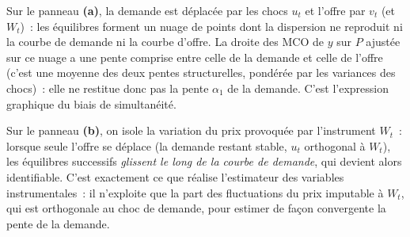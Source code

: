 \documentclass[12pt,a4paper,notitlepage]{article}
\begin{document}
Sur le panneau \textbf{(a)}, la demande est déplacée par les chocs
$u_t$ et l'offre par $v_t$ (et $W_t$)~: les équilibres forment un nuage
de points dont la dispersion ne reproduit ni la courbe de demande ni la
courbe d'offre. La droite des MCO de $y$ sur $P$ ajustée sur ce nuage a
une pente comprise entre celle de la demande et celle de l'offre (c'est
une moyenne des deux pentes structurelles, pondérée par les variances
des chocs)~: elle ne restitue donc pas la pente $\alpha_1$ de la
demande. C'est l'expression graphique du biais de simultanéité.

\medskip

Sur le panneau \textbf{(b)}, on isole la variation du prix provoquée par
l'instrument $W_t$~: lorsque seule l'offre se déplace (la demande
restant stable, $u_t$ orthogonal à $W_t$), les équilibres successifs
\emph{glissent le long de la courbe de demande}, qui devient alors
identifiable. C'est exactement ce que réalise l'estimateur des
variables instrumentales~: il n'exploite que la part des fluctuations
du prix imputable à $W_t$, qui est orthogonale au choc de demande, pour
estimer de façon convergente la pente de la demande.
\end{document}
